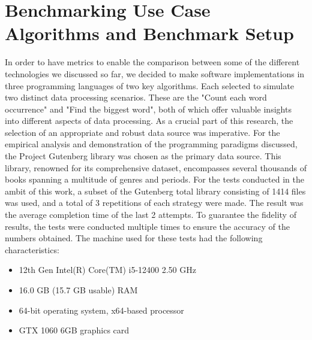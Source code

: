 

\lstset{basicstyle=\small\ttfamily, breaklines=true, frame=single}
\chapter{Benchmarking Use Case Algorithms and Benchmark Setup}
\label{cha:benchmarking_use_case_algorithms}

In order to have metrics to enable the comparison between some of the different technologies we discussed so far, we decided to make software implementations in three programming languages of two key algorithms. 
Each selected to simulate two distinct data processing scenarios. These are the "Count each word occurrence" and "Find the biggest word", both of which offer valuable insights into different aspects of data processing.
As a crucial part of this research, the selection of an appropriate and robust data source was imperative. For the empirical analysis and demonstration of the programming paradigms discussed, the Project Gutenberg library \cite{gutenberg} was chosen as the primary data source. This library, renowned for its comprehensive dataset, encompasses several thousands of books spanning a multitude of genres and periods. For the tests conducted in the ambit of this work, a subset of the Gutenberg total library consisting of 1414 files was used, and a total of 3 repetitions of each strategy were made. The result was the average completion time of the last 2 attempts. To guarantee the fidelity of results, the tests were conducted multiple times to ensure the accuracy of the numbers obtained. The machine used for these tests had the following characteristics:

\begin{itemize}
    \item 12th Gen Intel(R) Core(TM) i5-12400 2.50 GHz
    \item 16.0 GB (15.7 GB usable) RAM
    \item 64-bit operating system, x64-based processor
    \item GTX 1060 6GB graphics card
\end{itemize}

